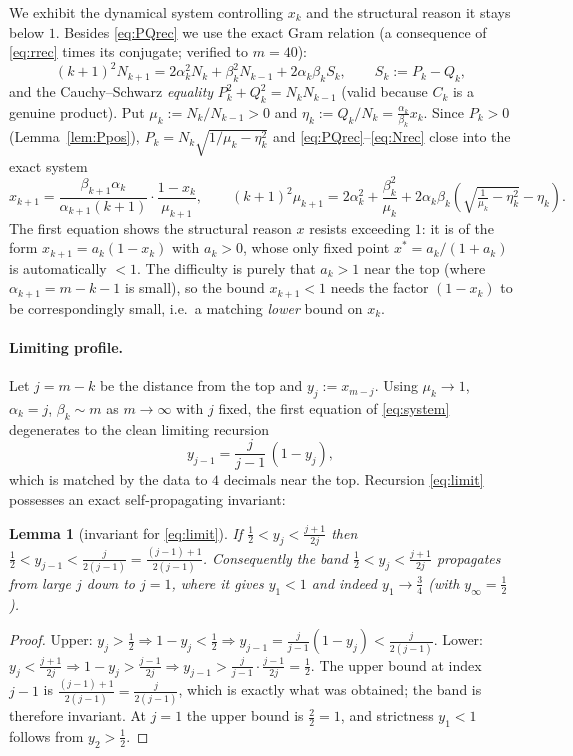 \documentclass[11pt]{article}
\newtheorem{lemma}{Lemma}
\theoremstyle{definition}
\begin{document}
We exhibit the dynamical system controlling $x_k$ and the structural reason it
stays below $1$.  Besides \eqref{eq:PQrec} we use the exact Gram relation (a
consequence of \eqref{eq:rrec} times its conjugate; verified to $m=40$):
\begin{equation}\label{eq:Nrec}
  (k+1)^2N_{k+1}=2\alpha_k^2N_k+\beta_k^2N_{k-1}+2\alpha_k\beta_k S_k,\qquad
  S_k:=P_k-Q_k,
\end{equation}
and the Cauchy--Schwarz \emph{equality} $P_k^2+Q_k^2=N_kN_{k-1}$ (valid because
$C_k$ is a genuine product).  Put $\mu_k:=N_k/N_{k-1}>0$ and
$\eta_k:=Q_k/N_k=\frac{\alpha_k}{\beta_k}x_k$.  Since $P_k>0$
(Lemma~\ref{lem:Ppos}), $P_k=N_k\sqrt{1/\mu_k-\eta_k^2}$ and
\eqref{eq:PQrec}--\eqref{eq:Nrec} close into the exact system
\begin{equation}\label{eq:system}
  x_{k+1}=\frac{\beta_{k+1}\alpha_k}{\alpha_{k+1}(k+1)}\cdot\frac{1-x_k}{\mu_{k+1}},
  \qquad
  (k+1)^2\mu_{k+1}=2\alpha_k^2+\frac{\beta_k^2}{\mu_k}
     +2\alpha_k\beta_k\!\left(\sqrt{\tfrac1{\mu_k}-\eta_k^2}-\eta_k\right).
\end{equation}
The first equation shows the structural reason $x$ resists exceeding $1$: it is of
the form $x_{k+1}=a_k(1-x_k)$ with $a_k>0$, whose only fixed point
$x^\ast=a_k/(1+a_k)$ is automatically $<1$.  The difficulty is purely that $a_k>1$
near the top (where $\alpha_{k+1}=m-k-1$ is small), so the bound $x_{k+1}<1$ needs
the factor $(1-x_k)$ to be correspondingly small, i.e.\ a matching \emph{lower}
bound on $x_k$.

\paragraph{Limiting profile.}  Let $j=m-k$ be the distance from the top and
$y_j:=x_{m-j}$.  Using $\mu_k\to1$, $\alpha_k=j$, $\beta_k\sim m$ as $m\to\infty$
with $j$ fixed, the first equation of \eqref{eq:system} degenerates to the clean
limiting recursion
\begin{equation}\label{eq:limit}
  y_{j-1}=\frac{j}{j-1}\,(1-y_j),
\end{equation}
which is matched by the data to $4$ decimals near the top.  Recursion
\eqref{eq:limit} possesses an exact self-propagating invariant:

\begin{lemma}[invariant for \eqref{eq:limit}]\label{lem:invariant}
If $\tfrac12<y_j<\tfrac{j+1}{2j}$ then $\tfrac12<y_{j-1}<\tfrac{j}{2(j-1)}
=\tfrac{(j-1)+1}{2(j-1)}$.  Consequently the band $\tfrac12<y_j<\tfrac{j+1}{2j}$
propagates from large $j$ down to $j=1$, where it gives $y_1<1$ and indeed
$y_1\to\tfrac34$ (with $y_\infty=\tfrac12$).
\end{lemma}
\begin{proof}
Upper: $y_j>\tfrac12\Rightarrow1-y_j<\tfrac12\Rightarrow
y_{j-1}=\tfrac{j}{j-1}(1-y_j)<\tfrac{j}{2(j-1)}$.  Lower:
$y_j<\tfrac{j+1}{2j}\Rightarrow1-y_j>\tfrac{j-1}{2j}\Rightarrow
y_{j-1}>\tfrac{j}{j-1}\cdot\tfrac{j-1}{2j}=\tfrac12$.  The upper bound at index
$j-1$ is $\tfrac{(j-1)+1}{2(j-1)}=\tfrac{j}{2(j-1)}$, which is exactly what was
obtained; the band is therefore invariant.  At $j=1$ the upper bound is
$\tfrac{2}{2}=1$, and strictness $y_1<1$ follows from $y_2>\tfrac12$.
\end{proof}
\end{document}

